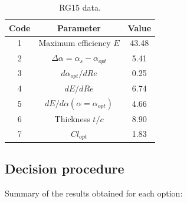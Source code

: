 \documentclass[../TFG_Annex.tex]{subfiles}
\begin{document}
\begin{table}[h!]
	\centering
	\begin{tabular}{c|c|c}
		Code & Parameter                                    & Value  \\ \hline
		1    & Maximum efficiency $E$                      &  43.48   \\
		2    & $\Delta \alpha=\alpha_{s}-\alpha_{opt}$    &        5.41         \\
		3    & ${d\alpha_{opt}}/{dRe}$                     &           0.25     \\
		4    & ${dE}/{dRe}$                                &        6.74    \\
		5    & ${dE}/{d \alpha} (\alpha=\alpha_{opt})$      &           4.66        \\
		6    & Thickness $t/c$                            &              8.90      \\
		7    & $Cl_{opt}$  &   1.83
	\end{tabular}
	\caption{RG15 data.}
	\label{tab:Airf18}
\end{table}

\newpage

\subsection{Decision procedure} \label{RA_Airfoil_Decision}

Summary of the results obtained for each option:
\end{document}
